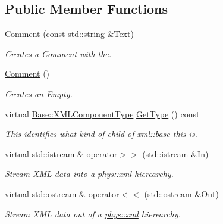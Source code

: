 \subsection*{Public Member Functions}
\begin{DoxyCompactItemize}
\item 
\hyperlink{classphys_1_1xml_1_1Comment_a16ddb7c6c2654975ccbd2cd5f184aeee}{Comment} (const std::string \&\hyperlink{classphys_1_1xml_1_1Text}{Text})
\begin{DoxyCompactList}\small\item\em Creates a \hyperlink{classphys_1_1xml_1_1Comment}{Comment} with the. \item\end{DoxyCompactList}\item 
\hypertarget{classphys_1_1xml_1_1Comment_a077d502747e68887537ca59af7f82b80}{
\hyperlink{classphys_1_1xml_1_1Comment_a077d502747e68887537ca59af7f82b80}{Comment} ()}
\label{d7/d0b/classphys_1_1xml_1_1Comment_a077d502747e68887537ca59af7f82b80}

\begin{DoxyCompactList}\small\item\em Creates an Empty. \item\end{DoxyCompactList}\item 
virtual \hyperlink{classphys_1_1xml_1_1Base_a62ba0484b5ecb502f9ae9d82d3720320}{Base::XMLComponentType} \hyperlink{classphys_1_1xml_1_1Comment_aec2edce12f5072a28da9bbdd94590c49}{GetType} () const 
\begin{DoxyCompactList}\small\item\em This identifies what kind of child of xml::base this is. \item\end{DoxyCompactList}\item 
virtual std::istream \& \hyperlink{classphys_1_1xml_1_1Comment_a8046da388ec75854122908540209d03a}{operator$>$$>$} (std::istream \&In)
\begin{DoxyCompactList}\small\item\em Stream XML data into a \hyperlink{namespacephys_1_1xml}{phys::xml} hierearchy. \item\end{DoxyCompactList}\item 
virtual std::ostream \& \hyperlink{classphys_1_1xml_1_1Comment_a764a71ce72b4152c4d588c7412b0d1a1}{operator$<$$<$} (std::ostream \&Out)
\begin{DoxyCompactList}\small\item\em Stream XML data out of a \hyperlink{namespacephys_1_1xml}{phys::xml} hierearchy. \item\end{DoxyCompactList}\end{DoxyCompactItemize}
